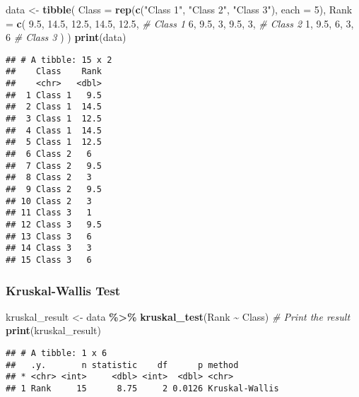 \documentclass[
]{article}
\newenvironment{Shaded}{\begin{snugshade}}{\end{snugshade}}
\newcommand{\AttributeTok}[1]{\textcolor[rgb]{0.13,0.29,0.53}{#1}}
\newcommand{\CommentTok}[1]{\textcolor[rgb]{0.56,0.35,0.01}{\textit{#1}}}
\newcommand{\DecValTok}[1]{\textcolor[rgb]{0.00,0.00,0.81}{#1}}
\newcommand{\FloatTok}[1]{\textcolor[rgb]{0.00,0.00,0.81}{#1}}
\newcommand{\FunctionTok}[1]{\textcolor[rgb]{0.13,0.29,0.53}{\textbf{#1}}}
\newcommand{\NormalTok}[1]{#1}
\newcommand{\OtherTok}[1]{\textcolor[rgb]{0.56,0.35,0.01}{#1}}
\newcommand{\SpecialCharTok}[1]{\textcolor[rgb]{0.81,0.36,0.00}{\textbf{#1}}}
\newcommand{\StringTok}[1]{\textcolor[rgb]{0.31,0.60,0.02}{#1}}
\begin{document}
\begin{Shaded}
\begin{Highlighting}[]
\NormalTok{data }\OtherTok{\textless{}{-}} \FunctionTok{tibble}\NormalTok{(}
  \AttributeTok{Class =} \FunctionTok{rep}\NormalTok{(}\FunctionTok{c}\NormalTok{(}\StringTok{"Class 1"}\NormalTok{, }\StringTok{"Class 2"}\NormalTok{, }\StringTok{"Class 3"}\NormalTok{), }\AttributeTok{each =} \DecValTok{5}\NormalTok{),}
  \AttributeTok{Rank =} \FunctionTok{c}\NormalTok{(}
    \FloatTok{9.5}\NormalTok{, }\FloatTok{14.5}\NormalTok{, }\FloatTok{12.5}\NormalTok{, }\FloatTok{14.5}\NormalTok{, }\FloatTok{12.5}\NormalTok{,  }\CommentTok{\# Class 1}
    \DecValTok{6}\NormalTok{, }\FloatTok{9.5}\NormalTok{, }\DecValTok{3}\NormalTok{, }\FloatTok{9.5}\NormalTok{, }\DecValTok{3}\NormalTok{,             }\CommentTok{\# Class 2}
    \DecValTok{1}\NormalTok{, }\FloatTok{9.5}\NormalTok{, }\DecValTok{6}\NormalTok{, }\DecValTok{3}\NormalTok{, }\DecValTok{6}               \CommentTok{\# Class 3}
\NormalTok{  )}
\NormalTok{)}
\FunctionTok{print}\NormalTok{(data)}
\end{Highlighting}
\end{Shaded}

\begin{verbatim}
## # A tibble: 15 x 2
##    Class    Rank
##    <chr>   <dbl>
##  1 Class 1   9.5
##  2 Class 1  14.5
##  3 Class 1  12.5
##  4 Class 1  14.5
##  5 Class 1  12.5
##  6 Class 2   6  
##  7 Class 2   9.5
##  8 Class 2   3  
##  9 Class 2   9.5
## 10 Class 2   3  
## 11 Class 3   1  
## 12 Class 3   9.5
## 13 Class 3   6  
## 14 Class 3   3  
## 15 Class 3   6
\end{verbatim}

\subsubsection{Kruskal-Wallis Test}\label{kruskal-wallis-test}

\begin{Shaded}
\begin{Highlighting}[]
\NormalTok{kruskal\_result }\OtherTok{\textless{}{-}}\NormalTok{ data }\SpecialCharTok{\%\textgreater{}\%}
  \FunctionTok{kruskal\_test}\NormalTok{(Rank }\SpecialCharTok{\textasciitilde{}}\NormalTok{ Class)}
\CommentTok{\# Print the result}
\FunctionTok{print}\NormalTok{(kruskal\_result)}
\end{Highlighting}
\end{Shaded}

\begin{verbatim}
## # A tibble: 1 x 6
##   .y.       n statistic    df      p method        
## * <chr> <int>     <dbl> <int>  <dbl> <chr>         
## 1 Rank     15      8.75     2 0.0126 Kruskal-Wallis
\end{verbatim}
\end{document}
